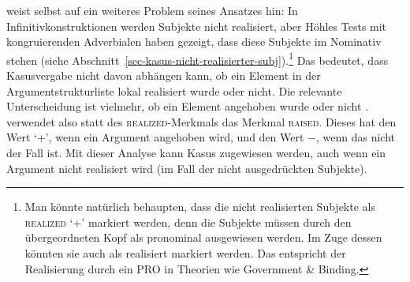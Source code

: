 \citet[93]{Prze99b} weist selbst auf ein weiteres Problem seines Ansatzes hin: In
Infinitivkonstruktionen werden Subjekte nicht realisiert, aber Höhles Tests mit kongruierenden
Adverbialen haben gezeigt, dass diese Subjekte im Nominativ stehen (siehe
Abschnitt~\ref{sec-kasus-nicht-realisierter-subj}).\footnote{%
Man könnte natürlich behaupten, dass die nicht realisierten Subjekte als \textsc{realized} `+'
markiert werden, denn die Subjekte müssen durch den übergeordneten Kopf als pronominal ausgewiesen
werden. Im Zuge dessen könnten sie auch als realisiert markiert werden. Das entspricht der
Realisierung durch ein PRO in Theorien wie Government \& Binding\indexgb \citep[Abschnitt~2.4.1]{Chomsky81a}.
} Das bedeutet, dass Kasusvergabe nicht davon
abhängen kann, ob ein Element in der Argumentstrukturliste lokal realisiert wurde oder nicht.
Die relevante Unterscheidung ist vielmehr, ob ein Element angehoben wurde oder nicht
\parencites{Meurers99b}[Abschnitt~10.4.1.4]{Meurers2000b}. \citeauthor{Prze99b} verwendet also statt des
\textsc{realized}-Merkmals das Merkmal \textsc{raised}. Dieses hat den Wert `+', wenn ein
Argument angehoben wird, und den Wert $-$, wenn das nicht der Fall ist. Mit dieser Analyse kann
Kasus zugewiesen werden, auch wenn ein Argument nicht realisiert wird (im Fall der nicht
ausgedrückten Subjekte).

